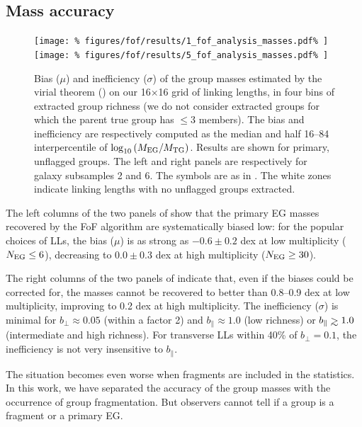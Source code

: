 \subsection{Mass accuracy}
%
\begin{figure}
    \centering
    \texttt{[image: \%
        figures/fof/results/1\_fof\_analysis\_masses.pdf\%
    ]}
    \texttt{[image: \%
        figures/fof/results/5\_fof\_analysis\_masses.pdf\%
    ]}
    \caption{Bias ($\mu$) and inefficiency ($\sigma$) of the group masses
        estimated  by the virial theorem () on our
        16$\times$16  grid of linking lengths, in four bins of extracted group
        richness (we do not consider extracted groups for which the parent true
        group has $\leq3$ members). The bias and inefficiency are respectively
        computed as the median and half 16--84 interpercentile of
        $\log_{10}\left(M_{\rm EG}/M_{\rm TG}\right)$. Results are shown for
        primary, unflagged groups. The left and right panels are respectively
        for galaxy subsamples 2 and 6. The symbols are as in
        . The white zones indicate linking
        lengths with no unflagged groups extracted.\label{fig:masses_diff}}
\end{figure}

The left columns  of the two panels of  show that
the primary EG masses recovered by the FoF algorithm are systematically biased
low: for the popular choices of LLs, the bias ($\mu$) is as strong as
$-0.6\pm0.2$ dex at low multiplicity ($N_{\rm EG}\leq 6$), decreasing to
$0.0\pm0.3$ dex at high multiplicity ($N_{\rm EG}\geq 30$).

The right columns of the two panels of  indicate
that, even if the biases could be corrected for, the masses cannot be recovered
to better than 0.8--0.9 dex at low multiplicity, improving to 0.2 dex at high
multiplicity. The  inefficiency ($\sigma$) is minimal for $b_\perp \approx
0.05$ (within a factor 2) and $b_\parallel \approx 1.0$ (low richness) or
$b_\parallel \ga 1.0$ (intermediate and high richness). For transverse LLs
within 40\% of $b_\perp=0.1$, the inefficiency is not very insensitive to
$b_\parallel$.

The situation becomes even worse when fragments are included in the statistics.
In this work, we have separated the accuracy of the group masses with the
occurrence of group fragmentation. But observers cannot tell if a group is a
fragment or a primary EG\@.

